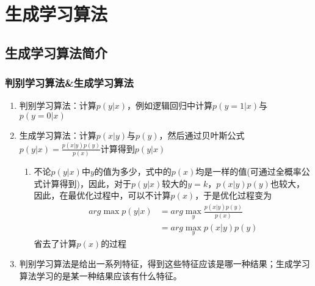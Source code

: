 \section{生成学习算法}
\subsection{生成学习算法简介}

\subsubsection{判别学习算法\&生成学习算法}
\begin{enumerate}
	\item 判别学习算法：计算$p(y|x)$，例如逻辑回归中计算$p(y=1|x)$与$p(y=0|x)$
	\item 生成学习算法：计算$p(x|y)$与$p(y)$，然后通过贝叶斯公式$p(y|x) = \frac{p(x|y)p(y)}{p(x)}$计算得到$p(y|x)$
	\begin{enumerate}
		\item 不论$p(y|x)$中$y$的值为多少，式中的$p(x)$均是一样的值(可通过全概率公式计算得到)，因此，对于$p(y|x)$较大的$y=k$，$p(x|y)p(y)$也较大，因此，在最优化过程中，可以不计算$p(x)$，于是优化过程变为
		\begin{align}
			arg\max{p(y|x)} &= arg \max_y{\frac{p(x|y)p(y)}{p(x)}} \\
			&= arg\max_y{p(x|y)p(y)}
		\end{align}
		省去了计算$p(x)$的过程
	\end{enumerate}
	
	\item 判别学习算法是给出一系列特征，得到这些特征应该是哪一种结果；生成学习算法学习的是某一种结果应该有什么特征。

\end{enumerate}



















